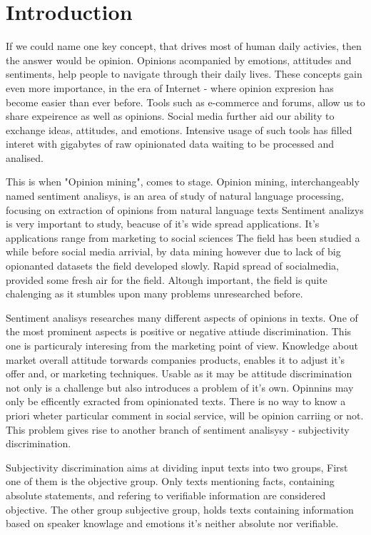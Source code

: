 \chapter{Introduction}

If we could name one key concept, that drives most of human daily activies, then the answer would be opinion. 
Opinions acompanied by emotions, attitudes and sentiments, help people to navigate through their daily lives. 
These concepts gain even more importance, in the era of Internet - where opinion expresion has become easier than ever before. 
Tools such as e-commerce and forums, allow us to share expeirence as well as opinions. Social media further aid our 
ability to exchange ideas, attitudes, and emotions. Intensive usage of such tools has filled interet with gigabytes of raw opinionated data waiting to
be processed and analised.

This is when "Opinion mining", comes to stage. Opinion mining, interchangeably named sentiment analisys,
 is an area of study of natural language processing, focusing on extraction of opinions from natural language texts
Sentiment analizys is very important to study, beacuse of it's wide spread applications. It's applications range from marketing to social sciences
The field has been studied a while before social media arrivial, by data mining
however due to lack of big opionanted datasets the field developed slowly. Rapid spread of socialmedia, provided some fresh air for the field.
Altough important, the field is quite chalenging as it stumbles upon many problems unresearched before.

Sentiment analisys researches many different aspects of opinions in texts. One of the most prominent aspects is positive or negative attiude discrimination.
This one is particuraly interesing from the marketing point of view. 
Knowledge about market overall attitude torwards companies products, enables it to adjust it's offer and, or marketing techniques. Usable as it may be
attitude discrimination not only is a challenge but also introduces a problem of it's own. Opinnins may only be efficently exracted from opinionated texts.
There is no way to know a priori wheter particular comment in social service, will be opinion carriing or not.  This problem gives rise to another branch
of sentiment analisysy  - subjectivity discrimination.

Subjectivity discrimination aims at dividing input texts into two groups, First one of them is the objective group. Only texts mentioning facts, 
containing absolute statements, and refering to verifiable information are considered objective. The other group  subjective group, holds texts
containing information based on speaker knowlage and emotions it's neither absolute nor verifiable.

